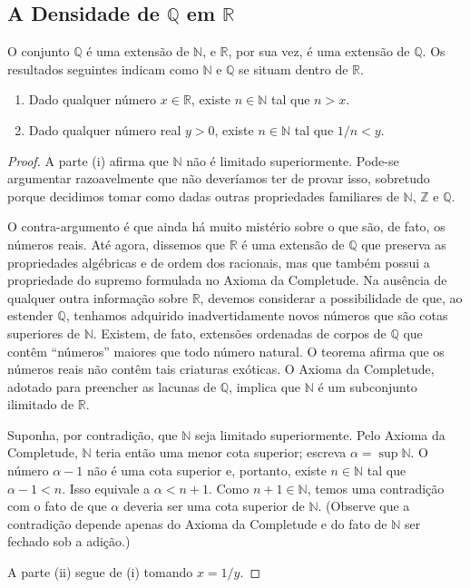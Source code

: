 \subsection{A Densidade de $\mathbb{Q}$ em $\mathbb{R}$}\label{subsec:densidade-q-r}

O conjunto $\mathbb{Q}$ é uma extensão de $\mathbb{N}$, e $\mathbb{R}$, por sua vez, é uma extensão de $\mathbb{Q}$. Os resultados seguintes indicam como $\mathbb{N}$ e $\mathbb{Q}$ se situam dentro de $\mathbb{R}$.

\begin{theorem}\label{thm:propriedade-arquimediana}
\begin{enumerate}[label=(\roman*)]
\item Dado qualquer número $x\in\mathbb{R}$, existe $n\in\mathbb{N}$ tal que $n>x$.
\item Dado qualquer número real $y>0$, existe $n\in\mathbb{N}$ tal que $1/n<y$.
\end{enumerate}
\end{theorem}

\begin{proof}
A parte (i) afirma que $\mathbb{N}$ não é limitado superiormente. Pode-se argumentar razoavelmente que não deveríamos ter de provar isso, sobretudo porque decidimos tomar como dadas outras propriedades familiares de $\mathbb{N}$, $\mathbb{Z}$ e $\mathbb{Q}$.

O contra-argumento é que ainda há muito mistério sobre o que são, de fato, os números reais. Até agora, dissemos que $\mathbb{R}$ é uma extensão de $\mathbb{Q}$ que preserva as propriedades algébricas e de ordem dos racionais, mas que também possui a propriedade do supremo formulada no Axioma da Completude. Na ausência de qualquer outra informação sobre $\mathbb{R}$, devemos considerar a possibilidade de que, ao estender $\mathbb{Q}$, tenhamos adquirido inadvertidamente novos números que são cotas superiores de $\mathbb{N}$. Existem, de fato, extensões ordenadas de corpos de $\mathbb{Q}$ que contêm ``números'' maiores que todo número natural. O teorema afirma que os números reais não contêm tais criaturas exóticas. O Axioma da Completude, adotado para preencher as lacunas de $\mathbb{Q}$, implica que $\mathbb{N}$ é um subconjunto ilimitado de $\mathbb{R}$.

Suponha, por contradição, que $\mathbb{N}$ seja limitado superiormente. Pelo Axioma da Completude, $\mathbb{N}$ teria então uma menor cota superior; escreva $\alpha=\sup\mathbb{N}$. O número $\alpha-1$ não é uma cota superior e, portanto, existe $n\in\mathbb{N}$ tal que $\alpha-1<n$. Isso equivale a $\alpha<n+1$. Como $n+1\in\mathbb{N}$, temos uma contradição com o fato de que $\alpha$ deveria ser uma cota superior de $\mathbb{N}$. (Observe que a contradição depende apenas do Axioma da Completude e do fato de $\mathbb{N}$ ser fechado sob a adição.) 

A parte (ii) segue de (i) tomando $x=1/y$.
\end{proof}

